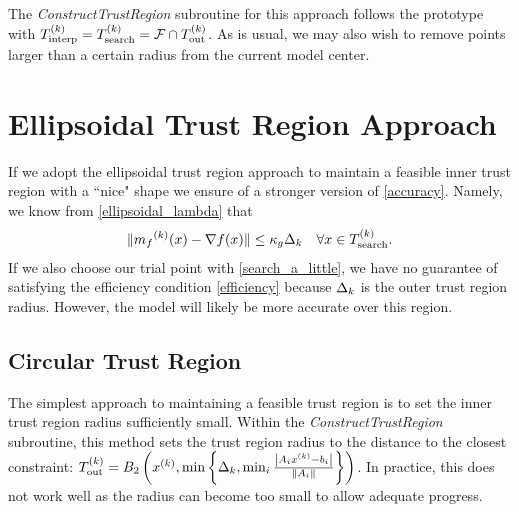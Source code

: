 The \emph{ConstructTrustRegion} subroutine for this approach follows the prototype with ${T_{\text{interp}}^{(k)}} = {T_{\text{search}}^{(k)}} = {\mathcal F} \cap {T_{\text{out}}^{(k)}} $.
As is usual, we may also wish to remove points larger than a certain radius from the current model center.






\section{Ellipsoidal Trust Region Approach}

If we adopt the ellipsoidal trust region approach to maintain a feasible inner trust region with a ``nice" shape we ensure of a stronger version of \cref{accuracy}.
Namely, we know from \cref{ellipsoidal_lambda} that 
\begin{align*}
    \|{{m}_f}^{(k)}(x) - \nabla f(x) \| \le \kappa_g \Delta_{k} \quad \forall x \in {T_{\text{search}}^{(k)}}.
\end{align*}
If we also choose our trial point with \cref{search_a_little}, we have no guarantee of satisfying the efficiency condition \cref{efficiency} because $\Delta_k$ is the outer trust region radius.
However, the model will likely be more accurate over this region.


\subsection{Circular Trust Region}
The simplest approach to maintaining a feasible trust region is to set the inner trust region radius sufficiently small.
Within the \emph{ConstructTrustRegion} subroutine, this method sets the trust region radius to the distance to the closest constraint:
${T_{\text{out}}^{(k)}} = B_2\left(x^{(k)}, \min\left\{\Delta_k, \min_{i}\frac{\left|A_ix^{(k)} - b_i\right|}{\left\|A_i\right\|} \right\}\right)$.
In practice, this does not work well as the radius can become too small to allow adequate progress.

